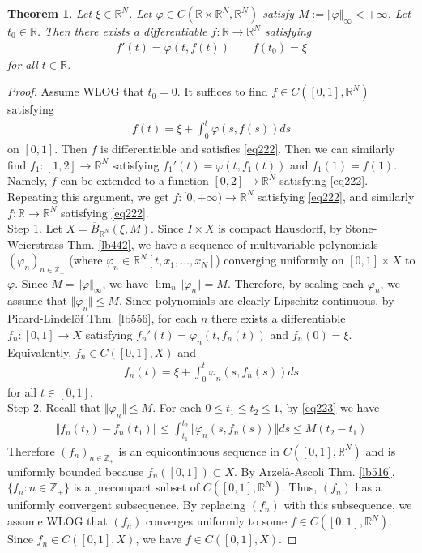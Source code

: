 \documentclass[12pt,b5paper,notitlepage]{article}
\theoremstyle{definition}
\theoremstyle{plain}
\newtheorem{thm}[df]{Theorem}
\newcommand{\ovl}{\overline}
\newcommand{\Zbb}{\mathbb Z}
\newcommand{\Rbb}{\mathbb R}
\numberwithin{equation}{section}
\begin{document}
\begin{thm}\label{lb557}
Let $\xi\in\Rbb^N$. Let $\varphi\in C(\Rbb\times\Rbb^N,\Rbb^N)$ satisfy $M:=\Vert\varphi\Vert_\infty<+\infty$. Let $t_0\in\Rbb$. Then there exists a differentiable $f:\Rbb\rightarrow\Rbb^N$ satisfying
\begin{align}
f'(t)=\varphi(t,f(t))\qquad f(t_0)=\xi \label{eq222}
\end{align}
for all $t\in\Rbb$.
\end{thm}


\begin{proof}
Assume WLOG that $t_0=0$. It suffices to find $f\in C([0,1],\Rbb^N)$ satisfying
\begin{align}
f(t)=\xi+\int_0^t\varphi(s,f(s))ds \label{eq224}
\end{align}
on $[0,1]$. Then $f$ is differentiable and satisfies \eqref{eq222}. Then we can similarly find $f_1:[1,2]\rightarrow\Rbb^N$ satisfying $f_1'(t)=\varphi(t,f_1(t))$ and $f_1(1)=f(1)$. Namely, $f$ can be extended to a function $[0,2]\rightarrow\Rbb^N$ satisfying \eqref{eq222}. Repeating this argument, we get $f:[0,+\infty)\rightarrow\Rbb^N$ satisfying \eqref{eq222}, and similarly $f:\Rbb\rightarrow\Rbb^N$ satisfying \eqref{eq222}.\\[-1ex]

Step 1. Let $X=\ovl B_{\Rbb^N}(\xi,M)$. Since $I\times X$ is compact Hausdorff, by Stone-Weierstrass Thm. \ref{lb442}, we have a sequence of multivariable polynomials $(\varphi_n)_{n\in\Zbb_+}$ (where $\varphi_n\in\Rbb^N[t,x_1,\dots,x_N]$) converging uniformly on $[0,1]\times X$ to $\varphi$. Since $M=\Vert\varphi\Vert_\infty$, we have $\lim_n\Vert\varphi_n\Vert=M$. Therefore, by scaling each $\varphi_n$, we assume that $\Vert\varphi_n\Vert\leq M$. Since polynomials are clearly Lipschitz continuous, by Picard-Lindel\"of Thm. \ref{lb556}, for each $n$ there exists a differentiable $f_n:[0,1]\rightarrow X$ satisfying $f_n'(t)=\varphi_n(t,f_n(t))$ and $f_n(0)=\xi$. Equivalently, $f_n\in C([0,1],X)$ and
\begin{align}
f_n(t)=\xi+\int_0^t\varphi_n(s,f_n(s))ds \label{eq223}
\end{align}
for all $t\in[0,1]$.\\[-1ex]

Step 2. Recall that $\Vert\varphi_n\Vert\leq M$. For each $0\leq t_1\leq t_2\leq 1$, by \eqref{eq223} we have
\begin{align*}
\Vert f_n(t_2)-f_n(t_1)\Vert\leq\int_{t_1}^{t_2}\Vert\varphi_n(s,f_n(s))\Vert ds\leq M(t_2-t_1)
\end{align*}
Therefore $(f_n)_{n\in\Zbb_+}$ is an equicontinuous sequence in $C([0,1],\Rbb^N)$ and is uniformly bounded because $f_n([0,1])\subset X$. By Arzel\`a-Ascoli Thm. \ref{lb516}, $\{f_n:n\in\Zbb_+\}$ is a precompact subset of $C([0,1],\Rbb^N)$. Thus, $(f_n)$ has a uniformly convergent subsequence. By replacing $(f_n)$ with this subsequence, we assume WLOG that $(f_n)$ converges uniformly to some $f\in C([0,1],\Rbb^N)$. Since $f_n\in C([0,1],X)$, we have $f\in C([0,1],X)$.


\end{proof}
\end{document}
